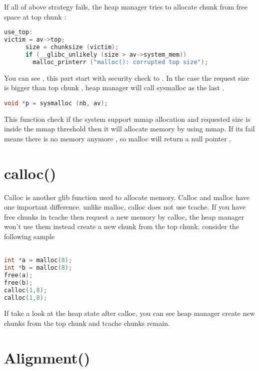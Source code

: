 \documentclass{masterthesis}
\newcommand*\tch{tcache}
\begin{document}
If all of above strategy fails, the heap manager tries to allocate chunk from free space at top chunk :
\begin{lstlisting}[language=c]
use_top:
victim = av->top;
      size = chunksize (victim);
      if (__glibc_unlikely (size > av->system_mem))
        malloc_printerr ("malloc(): corrupted top size");
\end{lstlisting}
You can see , this part start with security check to . In the case the request size is bigger than top chunk , heap manager will call sysmalloc as the last .
\begin{lstlisting}[language=c]
  void *p = sysmalloc (nb, av);
  \end{lstlisting}
This function check if the system support mmap allocation and requested size is inside the mmap threshold then it will allocate memory by using mmap. If its fail means there is no memory anymore , so malloc will return a null pointer .
\section{calloc()}
Calloc is another glib function used to allocate memory. Calloc and malloc have one important difference. unlike malloc, calloc does not use \tch{}. If you have free chunks in \tch{} then request a new memory by calloc, the heap manager won't use them instead create a new chunk from the top chunk. consider the following sample 
\begin{lstlisting}[language=c]

int *a = malloc(8);
int *b = malloc(8);
free(a);
free(b);
calloc(1,8);
calloc(1,8);
\end{lstlisting}
If take a look at the heap state after calloc, you can see heap manager create new chunks from the top chunk and tcache chunks remain.

\section{Alignment()}
\end{document}
